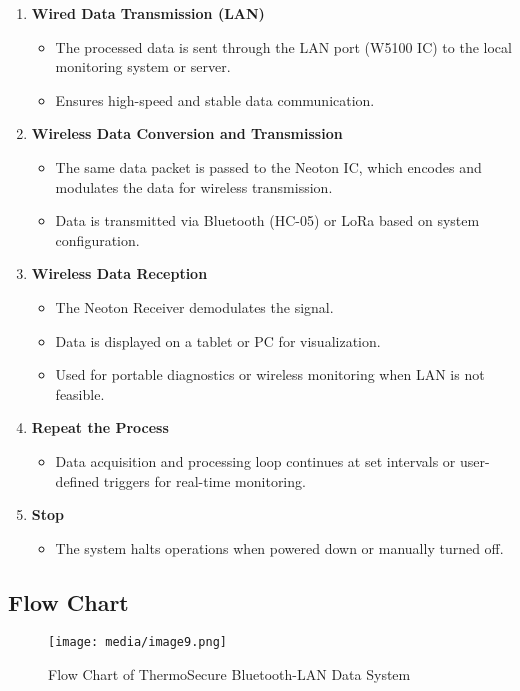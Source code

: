 \documentclass[12pt]{report}
\begin{document}
\begin{enumerate}
    \item \textbf{Wired Data Transmission (LAN)}
    \begin{itemize}
        \item The processed data is sent through the LAN port (W5100 IC) to the local monitoring system or server.
        \item Ensures high-speed and stable data communication.
    \end{itemize}
    
    \item \textbf{Wireless Data Conversion and Transmission}
    \begin{itemize}
        \item The same data packet is passed to the Neoton IC, which encodes and modulates the data for wireless transmission.
        \item Data is transmitted via Bluetooth (HC-05) or LoRa based on system configuration.
    \end{itemize}
    
    \item \textbf{Wireless Data Reception}
    \begin{itemize}
        \item The Neoton Receiver demodulates the signal.
        \item Data is displayed on a tablet or PC for visualization.
        \item Used for portable diagnostics or wireless monitoring when LAN is not feasible.
    \end{itemize}
    
    \item \textbf{Repeat the Process}
    \begin{itemize}
        \item Data acquisition and processing loop continues at set intervals or user-defined triggers for real-time monitoring.
    \end{itemize}
    
    \item \textbf{Stop}
    \begin{itemize}
        \item The system halts operations when powered down or manually turned off.
    \end{itemize}
\end{enumerate}

\subsection{Flow Chart}
\begin{figure}[ht]
    \centering
    \texttt{[image: media/image9.png]}
    \caption{Flow Chart of ThermoSecure Bluetooth-LAN Data System}
    \label{fig:flow_chart}
\end{figure}
\end{document}
